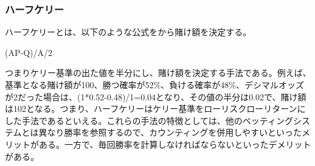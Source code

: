 \subsubsection{ハーフケリー}
ハーフケリーとは、以下のような公式をから賭け額を決定する。
\begin{center}
(AP-Q)/A/2
\end{center}
つまりケリー基準の出た値を半分にし、賭け額を決定する手法である。例えば、基準となる賭け額が100、勝つ確率が52\%、負ける確率が48\%、デシマルオッズが2だった場合は、(1*0.52-0.48)/1=0.04となり、その値の半分は0.02で、賭け額は102となる。つまり、ハーフケリーはケリー基準をローリスクローリターンにした手法であるといえる。これらの手法の特徴としては、他のベッティングシステムとは異なり勝率を参照するので、カウンティングを併用しやすいといったメリットがある。一方で、毎回勝率を計算しなければならないといったデメリットがある。

